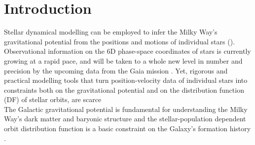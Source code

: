 \section{Introduction} \label{sec:intro}

Stellar dynamical modelling can be employed to infer the Milky Way's gravitational potential from the positions and motions of individual stars (\citealt{2008gady.book.....B,2011Prama..77...39B,2013A&ARv..21...61R}). Observational information on the 6D phase-space coordinates of stars is currently growing at a rapid pace, and will be taken to a whole new level in number and precision by the upcoming data from the Gaia mission \citep{2001A&A...369..339P}. Yet, rigorous and practical modelling tools that turn position-velocity data of individual stars into constraints both on the gravitational potential and on the distribution function (DF) of stellar orbits, are scarce \citep{2013A&ARv..21...61R} \\





The Galactic gravitational potential is fundamental for understanding the Milky Way's dark matter and baryonic structure \citep{2013A&ARv..21...61R,2012EPJWC..1910002M,2013PhR...531....1S,2014JPhG...41f3101R} and the stellar-population dependent orbit distribution function is a basic constraint on the Galaxy's formation history \citep{2013NewAR..57...29B,2013A&ARv..21...61R,2015MNRAS.449.3479S} .\\


